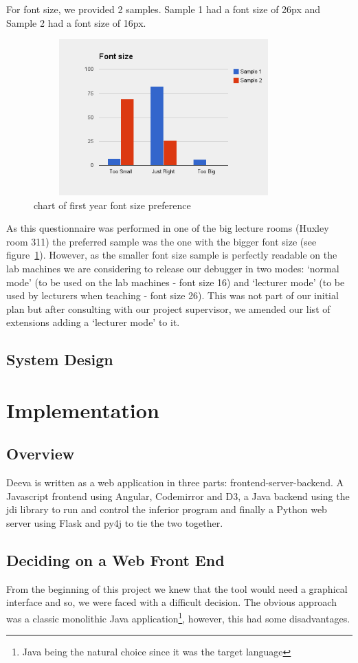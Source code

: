 \documentclass[11pt, a4paper]{article}
\begin{document}
For font size, we provided 2 samples.
Sample 1 had a font size of 26px and Sample 2 had a font size of 16px.
\begin{figure}[h!]
\centering
\includegraphics[height=60mm,width=100mm]{fonts.png}
\caption{chart of first year font size preference}
\label{fig:label}
\end{figure}
As this questionnaire was performed in one of the big lecture rooms (Huxley room 311) the preferred sample was the one with the bigger font size (see figure~\ref{fig:label}).
However, as the smaller font size sample is perfectly readable on the lab machines we are considering to release our debugger in two modes: `normal mode' (to be used on the lab machines - font size 16) and  `lecturer mode' (to be used by lecturers when teaching - font size 26).
This was not part of our initial plan but after consulting with our project supervisor, we amended our list of extensions adding a `lecturer mode' to it.

\subsection{System Design}
\section{Implementation}

\subsection{Overview}
Deeva is written as a web application in three parts: frontend-server-backend.
A Javascript frontend using Angular, Codemirror and D3, a Java backend using the jdi library to run and control the inferior program and finally a Python web server using Flask and py4j to tie the two together.

\subsection{Deciding on a Web Front End}
From the beginning of this project we knew that the tool would need a graphical interface and so, we were faced with a difficult decision.
The obvious approach was a classic monolithic Java application\footnote{Java being the natural choice since it was the target language}, however, this had some disadvantages.
\end{document}
